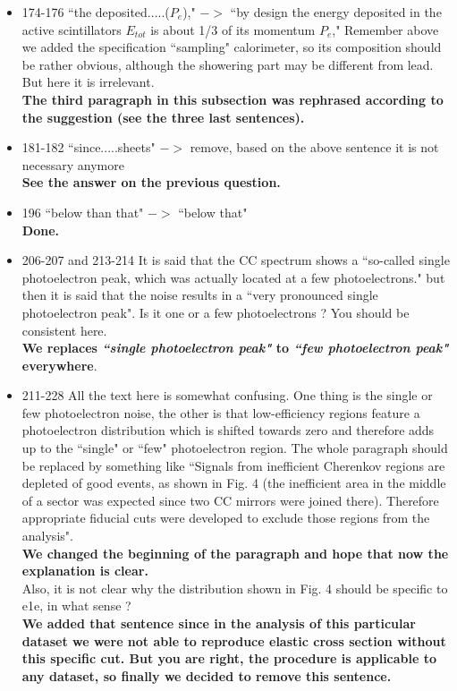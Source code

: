 \documentclass[,superscriptaddress,showpacs,amssymb,amsmath,amsfonts,linenumbers,article]{revtex4-1}
\begin{document}
\begin{itemize}
\item 174-176 ``the deposited.....($P_{e}$)," $->$ ``by design the energy deposited in the active scintillators $E_{tot}$ is about 1/3 of its momentum $P_{e}$," Remember above we added the specification ``sampling" calorimeter, so its composition should be rather obvious, although the showering part may be different from lead. But here it is irrelevant.\\
{\bf The third paragraph in this subsection was rephrased according to the suggestion (see the three last sentences).}

\item 181-182 ``since.....sheets" $->$ remove, based on the above sentence it is not necessary anymore\\
{\bf See the answer on the previous question.}

\item 196 ``below than that" $->$ ``below that"\\[0.5cm]
{\bf Done.}

\item 206-207 and 213-214 It is said that the CC spectrum shows a ``so-called single photoelectron peak, which was actually located at a few photoelectrons." but then it is said that the noise results in a ``very pronounced single photoelectron peak". Is it one or a few photoelectrons ? You should be consistent here.\\
{\bf We replaces \textbf{\textit{``single photoelectron peak"}} to \textbf{\textit{``few photoelectron peak"}} everywhere}.


\item 211-228 All the text here is somewhat confusing. One thing is the single or few photoelectron noise, the other is that low-efficiency regions feature a photoelectron distribution which is shifted towards zero and therefore adds up to the ``single" or ``few" photoelectron region. The whole paragraph should be replaced by
something like ``Signals from inefficient Cherenkov regions are depleted of good events, as shown in Fig. 4 (the inefficient area in the middle of a sector was expected since two CC mirrors were joined there). Therefore appropriate fiducial cuts were developed to exclude those regions from the analysis".\\
{\bf We changed the beginning of the paragraph and hope that now the explanation is clear.}\\[0.5cm]

Also, it is not clear why the distribution shown in Fig. 4 should be specific to e1e, in what sense ?\\
{\bf We added that sentence since in the analysis of this particular dataset we were not able to reproduce elastic cross section without this specific cut. But you are right, the procedure is applicable to any dataset, so finally we decided to remove this sentence.}\\[0.5cm]


\end{itemize}
\end{document}

